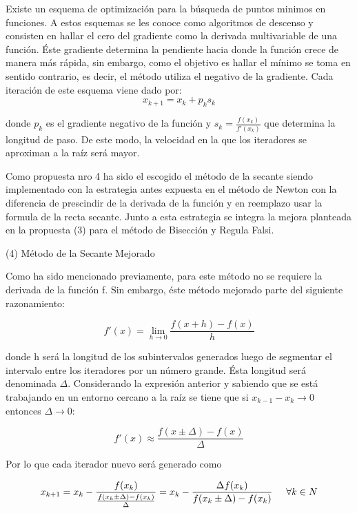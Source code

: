 \documentclass[11pt]{article}
\begin{document}
Existe un esquema de optimización para la búsqueda de puntos minimos en funciones. A estos esquemas se les conoce como algoritmos de descenso y consisten en hallar el cero del gradiente como la derivada multivariable de una función. Éste gradiente determina la pendiente hacia donde la función crece de manera más rápida, sin embargo, como el objetivo es hallar el mínimo se toma en sentido contrario, es decir, el método utiliza el negativo de la gradiente. Cada iteración de este esquema viene dado por: 
$$x_{k+1} = x_k + p_k s_k$$

donde $p_k$ es el gradiente negativo de la función y $s_k =\frac{f(x_k)}{f'(x_k)} $ que determina la longitud de paso. De este modo, la velocidad en la que los iteradores se aproximan a la raíz será mayor.

\vspace{0.5cm}

    
    
Como propuesta nro 4 ha sido el escogido el método de la secante siendo implementado con la estrategia antes expuesta en el método de Newton con la diferencia de prescindir de la derivada de la función y en reemplazo usar la formula de la recta secante. Junto a esta estrategia se integra la mejora planteada en la propuesta (3) para el método de Bisección y Regula Falsi.

\vspace{0.5cm}
{\large (4) Método de la Secante Mejorado}

Como ha sido mencionado previamente, para este método no se requiere la derivada de la función f. Sin embargo, éste método mejorado parte del siguiente razonamiento: 

$$f'(x) = \lim_{h \to 0}{\frac{f(x+h)-f(x)}{h}}$$

donde h será la longitud de los subintervalos generados luego de segmentar el intervalo entre los iteradores por un número grande. Ésta longitud será denominada $\Delta$. Considerando la expresión anterior y sabiendo que se está trabajando en un entorno cercano a la raíz se tiene que si $x_{k-1} - x_k \to 0$ entonces $\Delta \to 0$:

$$f'(x)	\approx \frac{f(x\pm\Delta)-f(x)}{\Delta}$$

Por lo que cada iterador nuevo será generado como

 $$x_{k+1} = x_k - \frac{f(x_k)}{ \frac{f(x_k\pm\Delta)-f(x_k)}{\Delta} } = 
  x_k - \frac{\Delta f(x_k)}{f(x_k\pm\Delta)-f(x_k)}
 \hspace{0.5cm} \forall k \in N$$ 
\end{document}
